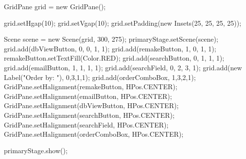 \begin{pyglist}[language=java,style=borland,numbers=left,numbersep=5pt]
{{        GridPane grid = new GridPane();

        grid.setHgap(10);
        grid.setVgap(10);
        grid.setPadding(new Insets(25, 25, 25, 25));

        Scene scene = new Scene(grid, 300, 275);
        primaryStage.setScene(scene);
        grid.add(dbViewButton, 0, 0, 1, 1);
        grid.add(remakeButton, 1, 0, 1, 1);
        remakeButton.setTextFill(Color.RED);
        grid.add(searchButton, 0, 1, 1, 1);
        grid.add(emailButton, 1, 1, 1, 1);
        grid.add(searchField, 0, 2, 3, 1);
        grid.add(new Label("Order by: "), 0,3,1,1);
        grid.add(orderComboBox, 1,3,2,1);
        GridPane.setHalignment(remakeButton, HPos.CENTER);
        GridPane.setHalignment(emailButton, HPos.CENTER);
        GridPane.setHalignment(dbViewButton, HPos.CENTER);
        GridPane.setHalignment(searchButton, HPos.CENTER);
        GridPane.setHalignment(searchField, HPos.CENTER);
        GridPane.setHalignment(orderComboBox, HPos.CENTER);


        primaryStage.show();
    }

}	
	\end{pyglist}

